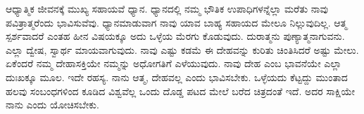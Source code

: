 ಆಧ್ಯಾತ್ಮಿಕ ಜೀವನಕ್ಕೆ ಮುಖ್ಯ ಸಹಾಯವೆ ಧ್ಯಾನ. ಧ್ಯಾನದಲ್ಲಿ ನಮ್ಮ ಭೌತಿಕ ಉಪಾಧಿಗಳನ್ನೆಲ್ಲಾ ಮರೆತು ನಾವು ಪವಿತ್ರಾತ್ಮರೆಂದು ಭಾವಿಸುವೆವು. ಧ್ಯಾನಮಾಡುವಾಗ ನಾವು ಯಾವ ಬಾಹ್ಯ ಸಹಾಯದ ಮೇಲೂ ನಿಲ್ಲುವುದಿಲ್ಲ. ಆತ್ಮ ಸ್ಪರ್ಶವಾದರೆ ಎಂತಹ ಹೀನ ವಿಷಯಕ್ಕೂ ಅದು ಒಳ್ಳೆಯ ಮೆರಗು ಕೊಡುವುದು. ದುರಾತ್ಮನು ಪುಣ್ಯಾತ್ಮನಾಗುವನು. ಎಲ್ಲಾ ದ್ವೇಷ, ಸ್ವಾರ್ಥ ಮಾಯವಾಗುವುದು. ನಾವು ಎಷ್ಟು ಕಡಮೆ ಈ ದೇಹವನ್ನು ಕುರಿತು ಚಿಂತಿಸಿದರೆ ಅಷ್ಟು ಮೇಲು. ಏಕೆಂದರೆ ನಮ್ಮ ದೇಹಾಸಕ್ತಿಯೇ ನಮ್ಮನ್ನು ಅಧೋಗತಿಗೆ ಎಳೆಯುವುದು. ನಾವು ದೇಹ ಎಂಬ ಭಾವನೆಯೇ ಎಲ್ಲಾ ದುಃಖಕ್ಕೂ ಮೂಲ. ಇದೇ ರಹಸ್ಯ. ನಾನು ಆತ್ಮ, ದೇಹವಲ್ಲ ಎಂದು ಭಾವಿಸಬೇಕು. ಒಳ್ಳೆಯದು ಕೆಟ್ಟದ್ದು ಮುಂತಾದ ಹಲವು ಸಂಬಂಧಗಳಿಂದ ಕೂಡಿದ ವಿಶ್ವವೆಲ್ಲ ಒಂದು ದೊಡ್ಡ ಪಟದ ಮೇಲೆ ಬರೆದ ಚಿತ್ರದಂತೆ ಇದೆ. ಅದರ ಸಾಕ್ಷಿಯೇ ನಾನು ಎಂದು ಯೋಚಿಸಬೇಕು.

